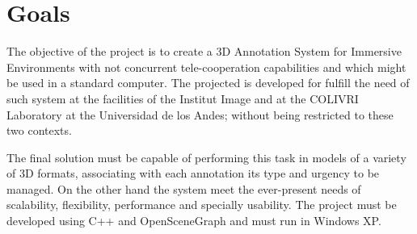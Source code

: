 \section{Goals}
The objective of the project is to create a 3D Annotation System for Immersive Environments with not concurrent tele-cooperation capabilities and which might be used in a standard computer. The projected is developed for fulfill the need of such system at the facilities of the Institut Image and at the COLIVRI Laboratory at the Universidad de los Andes; without being restricted to these two contexts.

The final solution must be capable of performing this task in models of a variety of 3D formats, associating with each annotation its type and urgency to be managed. On the other hand the system meet the ever-present needs of scalability, flexibility, performance and specially usability. The project must be developed using C++ and OpenSceneGraph and must run in Windows XP.